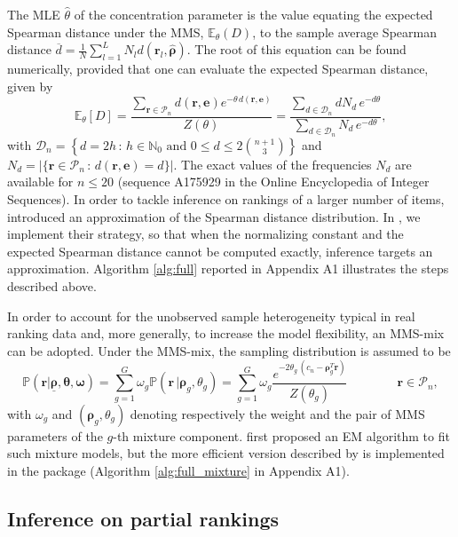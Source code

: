 The MLE $\hat\theta$ of the concentration parameter is the value equating the expected Spearman distance under the MMS, $\mathbb{E}_\theta(D)$, to the sample average Spearman distance $\overline{d}=\frac{1}{N}\sum_{l=1}^LN_ld(\bm{r}_l,\hat{\bm{\rho}})$. The root of this equation can be found numerically, provided that one can evaluate the expected Spearman distance, given by
$$\mathbb{E}_{\theta}[D] = \frac{\sum_{\bm{r} \in \mathcal{P}_{n}} d(\bm{r},\bm e) e^{-\theta\, d(\bm{r},\bm e)}}{Z(\theta)}=
\frac{\sum_{d\in\mathcal{D}_n}dN_d \,e^{-d\theta}}{\sum_{d\in\mathcal{D}_n}N_d \,e^{-d\theta}},$$
with $\mathcal{D}_n=\left\{d=2h\, : \, h\in\mathbb{N}_0\text{ and } 0\leq d\leq 2\binom{n+1}{3}\right\}$ and $N_d=\vert\{\bm{r}\in\mathcal{P}_{n}\,:\,d(\bm{r},\bm{e})=d\}\vert$. The exact values of the frequencies $N_d$ are available for $n\leq 20$ (sequence A175929 in the Online Encyclopedia of Integer Sequences). In order to tackle inference on rankings of a larger number of items, \cite{crispino23efficient} introduced an approximation of the Spearman distance distribution.
In , we implement their strategy, so that when the normalizing constant and the expected Spearman distance cannot be computed exactly, inference targets an approximation.  Algorithm \ref{alg:full} reported in Appendix A1 illustrates the steps described above.

In order to account for the unobserved sample heterogeneity typical in real ranking data and, more generally, to increase the model flexibility, an MMS-mix can be adopted. Under the MMS-mix, the sampling distribution is assumed to be 
\begin{equation*}
\label{e:CLog.lik.mixEPL}
\mathbb{P}(\bm{r}|\underline{\bm{\rho}},{\bm{\theta}},{\bm{\omega}})
=\sum_{g=1}^G\omega_g\mathbb{P}(\bm{r}\,|\bm{\rho}_g,\theta_g)
=\sum_{g=1}^G\omega_g\frac{e^{-2\theta_g\, \left(c_n-\bm{\rho}_g^T\bm{r}\right)}}{Z(\theta_g)}\qquad\qquad\bm{r}\in\mathcal{P}_n,
\end{equation*}
%
with $\omega_g$ and $(\bm{\rho}_g,\theta_g)$ denoting respectively the weight and the pair of MMS parameters of the $g$-th mixture component.
\cite{MurphyMartin2003} first proposed an EM algorithm to fit such mixture models, but the more efficient version described by \cite{crispino23efficient} is implemented in the  package (Algorithm \ref{alg:full_mixture} in Appendix A1).

\subsection{Inference on partial rankings}
\label{ssec:partial}

